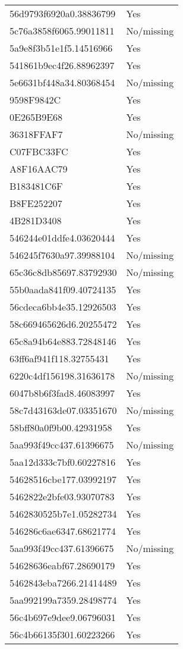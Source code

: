 \begin{tabular}{ll}
56d9793f6920a0.38836799 & Yes \\
5c76a3858f6065.99011811 & No/missing \\
5a9e8f3b51e1f5.14516966 & Yes \\
541861b9ec4f26.88962397 & Yes \\
5e6631bf448a34.80368454 & No/missing \\
9598F9842C & Yes \\
0E265B9E68 & Yes \\
36318FFAF7 & No/missing \\
C07FBC33FC & Yes \\
A8F16AAC79 & Yes \\
B183481C6F & Yes \\
B8FE252207 & Yes \\
4B281D3408 & Yes \\
546244e01ddfe4.03620444 & Yes \\
546245f7630a97.39988104 & No/missing \\
65c36c8db85697.83792930 & No/missing \\
55b0aada841f09.40724135 & Yes \\
56cdeca6bb4e35.12926503 & Yes \\
58c669465626d6.20255472 & Yes \\
65c8a94b64e883.72848146 & Yes \\
63ff6af941f118.32755431 & Yes \\
6220c4df156198.31636178 & No/missing \\
6047b8b6f3fad8.46083997 & Yes \\
58c7d43163de07.03351670 & No/missing \\
58bff80a0f9b00.42931958 & Yes \\
5aa993f49cc437.61396675 & No/missing \\
5aa12d333c7bf0.60227816 & Yes \\
54628516cbe177.03992197 & Yes \\
5462822e2bfe03.93070783 & Yes \\
5462830525b7e1.05282734 & Yes \\
546286c6ae6347.68621774 & Yes \\
5aa993f49cc437.61396675 & No/missing \\
54628636eabf67.28690179 & Yes \\
5462843eba7266.21414489 & Yes \\
5aa992199a7359.28498774 & Yes \\
56c4b697e9dee9.06796031 & Yes \\
56c4b66135f301.60223266 & Yes \\

\end{tabular}
